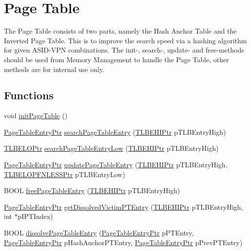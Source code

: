 \hypertarget{group___v_m_m___p_t}{
\section{Page Table}
\label{group___v_m_m___p_t}
}
The Page Table consists of two parts, namely the Hash Anchor Table and the Inverted Page Table. This is to improve the search speed via a hashing algorithm for given ASID-VPN combinations. The init-, search-, update- and free-methods should be used from Memory Management to handle the Page Table, other methods are for internal use only.  


\subsection*{Functions}
\begin{CompactItemize}
\item 
void \hyperlink{group___v_m_m___p_t_gf5ebfb7e466013140327368b655792fe}{initPageTable} ()
\item 
\hyperlink{struct_page_table_entry}{PageTableEntryPtr} \hyperlink{group___v_m_m___p_t_g8edbef60b1d72e6ad3dffed3c57b5e7c}{searchPageTableEntry} (\hyperlink{struct_t_l_b_e_h_i}{TLBEHIPtr} pTLBEntryHigh)
\item 
\hyperlink{struct_t_l_b_e_l_o}{TLBELOPtr} \hyperlink{group___v_m_m___p_t_g0021597aea50ac13519f811f316c4fd7}{searchPageTableEntryLow} (\hyperlink{struct_t_l_b_e_h_i}{TLBEHIPtr} pTLBEntryHigh)
\item 
\hyperlink{struct_page_table_entry}{PageTableEntryPtr} \hyperlink{group___v_m_m___p_t_g621765a4679ecc5e2d8e1257ba21d440}{updatePageTableEntry} (\hyperlink{struct_t_l_b_e_h_i}{TLBEHIPtr} pTLBEntryHigh, \hyperlink{struct_t_l_b_e_l_o_p_f_n_l_e_s_s}{TLBELOPFNLESSPtr} pTLBEntryLow)
\item 
BOOL \hyperlink{group___v_m_m___p_t_g85b6e33ff8a22b5c1e9e0b36e8f24c4c}{freePageTableEntry} (\hyperlink{struct_t_l_b_e_h_i}{TLBEHIPtr} pTLBEntryHigh)
\item 
\hyperlink{struct_page_table_entry}{PageTableEntryPtr} \hyperlink{group___v_m_m___p_t_g64821ed5828e71fb8cb12f99fffae069}{getDissolvedVictimPTEntry} (\hyperlink{struct_t_l_b_e_h_i}{TLBEHIPtr} pTLBEntryHigh, int $\ast$pIPTIndex)
\item 
BOOL \hyperlink{group___v_m_m___p_t_g0037f23be8f09ed71ce7ff34f93adcb9}{dissolvePageTableEntry} (\hyperlink{struct_page_table_entry}{PageTableEntryPtr} pPTEntry, \hyperlink{struct_page_table_entry}{PageTableEntryPtr} pHashAnchorPTEntry, \hyperlink{struct_page_table_entry}{PageTableEntryPtr} pPrevPTEntry)

\end{CompactItemize}
